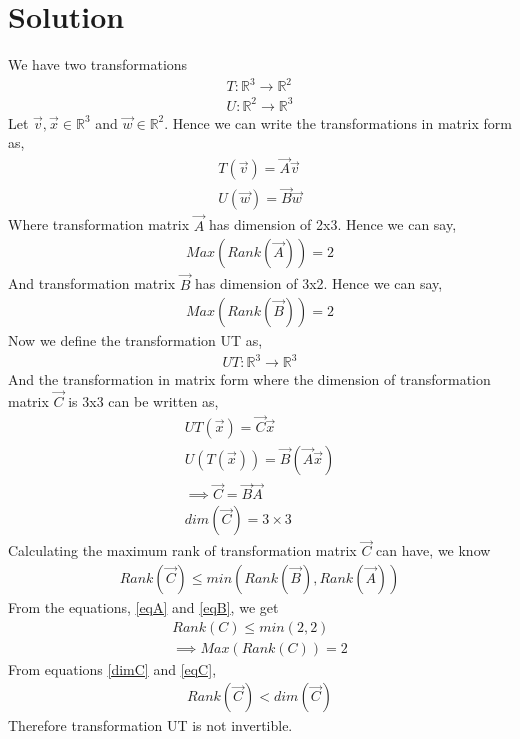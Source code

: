 \documentclass[journal,12pt,twocolumn]{IEEEtran}
\begin{document}
\section{Solution}
We have two transformations 
\begin{align}
T:\mathbb{R}^3\rightarrow\mathbb{R}^2\\
U:\mathbb{R}^2\rightarrow\mathbb{R}^3
\end{align}
Let $\vec{v},\vec{x}\in\mathbb{R}^3$ and $\vec{w}\in\mathbb{R}^2$. Hence we can write the transformations in matrix form as,
\begin{align}
T(\vec{v})=\vec{A}\vec{v}\\
U(\vec{w})=\vec{B}\vec{w}
\end{align}
Where transformation matrix $\vec{A}$ has dimension of 2x3. Hence we can say,
\begin{align}\label{eqA}
Max(Rank(\vec{A}))=2
\end{align}
And transformation matrix $\vec{B}$ has dimension of 3x2. Hence we can say,
\begin{align}\label{eqB}
Max(Rank(\vec{B}))=2
\end{align}
Now we define the transformation UT as,
\begin{align}
UT:\mathbb{R}^3\rightarrow\mathbb{R}^3
\end{align}
And the transformation in matrix form where the dimension of transformation matrix $\vec{C}$ is 3x3 can be written as,
\begin{align}
UT(\vec{x})=\vec{C}\vec{x}\\
U(T(\vec{x}))=\vec{B}(\vec{A}\vec{x})\\
\implies \vec{C}=\vec{B}\vec{A}\\
dim(\vec{C})=3\times3 \label{dimC}
\end{align}
Calculating the maximum rank of transformation matrix $\vec{C}$ can have, we know
\begin{align}
Rank(\vec{C})\le min(Rank(\vec{B}),Rank(\vec{A}))
\end{align}
From the equations, \eqref{eqA} and \eqref{eqB}, we get
\begin{align}
Rank(C)\le min(2,2)\\
\implies Max(Rank(C))=2 \label{eqC}
\end{align}
From equations \eqref{dimC} and \eqref{eqC},
\begin{align}
Rank(\vec{C})< dim(\vec{C})
\end{align}
Therefore transformation UT is not invertible.
\end{document}
